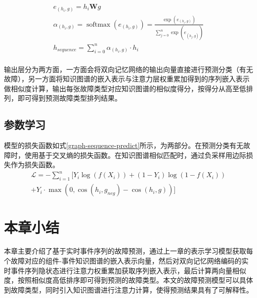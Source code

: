 \begin{equation}
    \begin{array}{l}
    e_{(h_{i} , g)} = h_{i}\mathbf{W}g\\
    \alpha_{(h_{i} , g)}=\operatorname{softmax}\left(e_{(h_{i} , g)}\right)=\frac{\exp \left(e_{(h_{i} , g)}\right)}{\sum_{j=0}^{n}  \exp \left(e_{\left(h_{j} , g\right )}\right)}\\
    h_{sequence} = \sum_{i=0}^{n}\alpha_{(h_{i} , g)}\cdot h_{i}\\
    \end{array}
    \label{sequence-hidden}
\end{equation}

输出层分为两方面，一方面会将双向记忆网络的输出向量直接进行预测分类（有无故障），另一方面将知识图谱的嵌入表示与注意力层权重累加得到的序列嵌入表示做相似度计算，输出每张故障类型对应知识图谱的相似度得分，按得分从高至低排列，即可得到预测故障类型排列结果。

\subsection{参数学习}
模型的损失函数如式\ref{graph-sequence-predict}所示，为两部分。在预测分类有无故障时，使用基于交叉熵的损失函数。在知识图谱相似匹配时，通过负采样用边际损失作为损失函数。
\begin{equation}
    \begin{aligned}
        \mathcal{L}=-\sum_{i=1}^{n}[Y_{i} \log \left(f\left(X_{i} \right)\right)
        +\left(1-Y_{i}\right) \log \left(1-f\left(X_{i} \right)\right)\\
+Y_{i}\cdot \max \left (0, \cos \left (h_{i}, g_{neg} \right ) - \cos \left (h_{i}, g \right )\right )]
    \end{aligned}
    \label{graph-sequence-predict}
\end{equation}

\section{本章小结}
本章主要介绍了基于实时事件序列的故障预测，通过上一章的表示学习模型获取每个故障对应的组件-事件知识图谱的嵌入表示向量，然后对双向记忆网络编码的实时事件序列隐状态进行注意力权重累加获取序列嵌入表示，最后计算两向量相似度，按照相似度高低排序即可得到预测的故障类型。本文的故障预测模型可以具体到故障类型，同时引入知识图谱进行注意力计算，使得预测结果具有了可解释性。